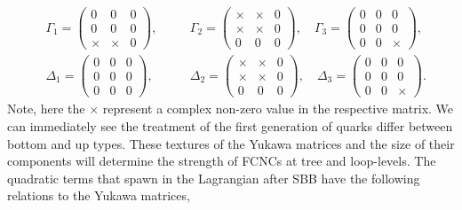 \documentclass[10pt]{book}
\renewcommand{\(}{\left(}
\renewcommand{\)}{\right)}
\renewcommand{\[}{\left[}
\renewcommand{\]}{\right]}
\begin{document}
\begin{equation}
\begin{aligned}
&\Gamma_1  = \begin{pmatrix}
0 & 0 & 0\\
0 & 0 & 0\\
\times & \times & 0
\end{pmatrix}, \quad 
&&\Gamma_2  = \begin{pmatrix}
\times & \times & 0\\
\times & \times & 0\\
0 & 0 & 0
\end{pmatrix}, \quad
\Gamma_3  = \begin{pmatrix}
0 & 0 & 0\\
0 & 0 & 0\\
0 & 0 & \times
\end{pmatrix}, \\[1em]
&\Delta_1  = \begin{pmatrix}
0 & 0 & 0\\
0 & 0 & 0\\
0 & 0 & 0
\end{pmatrix}, \quad 
&&\Delta_2 = \begin{pmatrix}
\times & \times & 0\\
\times & \times & 0\\
0 & 0 & 0
\end{pmatrix} , \quad 
\Delta_3 = \begin{pmatrix}
0 & 0 & 0\\
0 & 0 & 0\\
0 & 0 & \times
\end{pmatrix}. 
\end{aligned} 
\end{equation}
%
Note, here the $\times$ represent a complex non-zero value in the respective matrix. 
%
We can immediately see the treatment of the first generation of quarks differ between bottom and up types. 
%
%
These textures of the Yukawa matrices and the size of their components will determine the strength of FCNCs at tree and loop-levels. 
%
%
%
The quadratic terms that spawn in the Lagrangian after SBB have the following relations to the Yukawa matrices,
\end{document}

